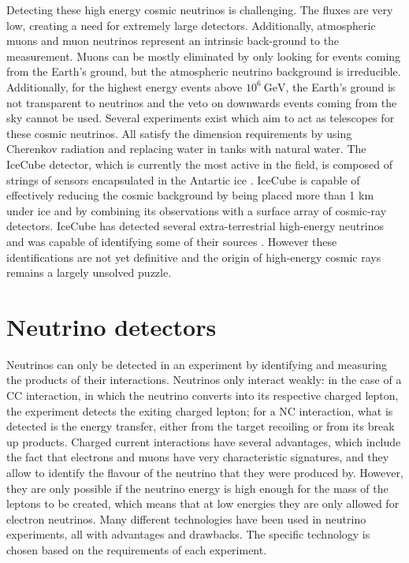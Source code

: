 Detecting these high energy cosmic neutrinos is challenging. The fluxes are very low, creating a need for extremely large detectors. Additionally, atmospheric muons and muon neutrinos represent an intrinsic back-ground to the measurement. Muons can be mostly eliminated by only looking for events coming from the Earth's ground, but the atmospheric neutrino background is irreducible. Additionally, for the highest energy events above $10^6 \ \text{GeV}$, the Earth's ground is not transparent to neutrinos and the veto on downwards events coming from the sky cannot be used. Several experiments exist which aim to act as telescopes for these cosmic neutrinos. All satisfy the dimension requirements by using Cherenkov radiation and replacing water in tanks with natural water. The IceCube detector, which is currently the most active in the field, is composed of strings of sensors encapsulated in the Antartic ice \cite{IceCube:2016zyt}. IceCube is capable of effectively reducing the cosmic background by being placed more than 1 km under ice and by combining its observations with a surface array of cosmic-ray detectors. IceCube has detected several extra-terrestrial high-energy neutrinos and was capable of identifying some of their sources \cite{IceCube:2021slf}. However these identifications are not yet definitive and the origin of high-energy cosmic rays remains a largely unsolved puzzle.

\section{Neutrino detectors}
\label{Sec:NeutrinoDetectors}
Neutrinos can only be detected in an experiment by identifying and measuring the products of their interactions. Neutrinos only interact weakly: in the case of a CC interaction, in which the neutrino converts into its respective charged lepton, the experiment detects the exiting charged lepton; for a NC interaction, what is detected is the energy transfer, either from the target recoiling or from its break up products. Charged current interactions have several advantages, which include the fact that electrons and muons have very characteristic signatures, and they allow to identify the flavour of the neutrino that they were produced by. However, they are only possible if the neutrino energy is high enough for the mass of the leptons to be created, which means that at low energies they are only allowed for electron neutrinos. Many different technologies have been used in neutrino experiments, all with advantages and drawbacks. The specific technology is chosen based on the requirements of each experiment.
